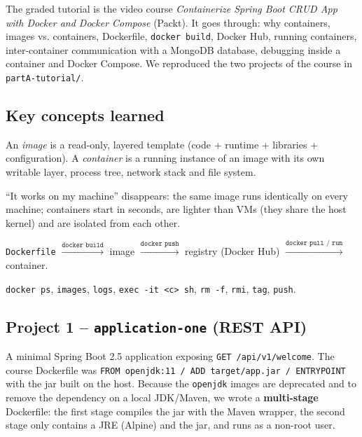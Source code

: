 \documentclass[11pt,a4paper]{article}
\begin{document}
The graded tutorial is the video course \emph{Containerize Spring Boot CRUD App with
Docker and Docker Compose} (Packt). It goes through: why containers, images vs.
containers, Dockerfile, \texttt{docker build}, Docker Hub, running containers,
inter-container communication with a MongoDB database, debugging inside a container
and Docker Compose. We reproduced the two projects of the course in
\texttt{partA-tutorial/}.

\subsection{Key concepts learned}
\begin{description}[leftmargin=1.2em,style=nextline]
  \item[Image vs. container] An \emph{image} is a read-only, layered template (code +
  runtime + libraries + configuration). A \emph{container} is a running instance of an
  image with its own writable layer, process tree, network stack and file system.
  \item[Why Docker] ``It works on my machine'' disappears: the same image runs
  identically on every machine; containers start in seconds, are lighter than VMs
  (they share the host kernel) and are isolated from each other.
  \item[Workflow] \texttt{Dockerfile} $\xrightarrow{\texttt{docker build}}$ image
  $\xrightarrow{\texttt{docker push}}$ registry (Docker Hub)
  $\xrightarrow{\texttt{docker pull / run}}$ container.
  \item[Useful commands] \texttt{docker ps}, \texttt{images}, \texttt{logs},
  \texttt{exec -it <c> sh}, \texttt{rm -f}, \texttt{rmi}, \texttt{tag}, \texttt{push}.
\end{description}

\subsection{Project 1 -- \texttt{application-one} (REST API)}
A minimal Spring Boot 2.5 application exposing \texttt{GET /api/v1/welcome}.
The course Dockerfile was \texttt{FROM openjdk:11 / ADD target/app.jar / ENTRYPOINT}
with the jar built on the host. Because the \texttt{openjdk} images are deprecated
and to remove the dependency on a local JDK/Maven, we wrote a \textbf{multi-stage}
Dockerfile: the first stage compiles the jar with the Maven wrapper, the second stage
only contains a JRE (Alpine) and the jar, and runs as a non-root user.
\end{document}
